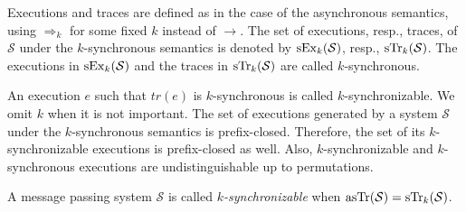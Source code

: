 Executions and traces are defined as in the case of the asynchronous semantics, using $\Rightarrow_k$ for some fixed $k$ instead of $\rightarrow$. The set of executions, resp., traces, of $\mathcal{S}$ under the $k$-synchronous semantics is denoted by $\synchExec{\mathcal{S}}{k}$, resp., $\synchTr{\mathcal{S}}{k}$. The executions in $\synchExec{\mathcal{S}}{k}$ and the traces in 
$\synchTr{\mathcal{S}}{k}$ are called $k$-synchronous. 

An execution $e$ such that $tr(e)$ is $k$-synchronous is called $k$-synchronizable. We omit $k$ when it is not important. 
The set of executions generated by a system $\mathcal{S}$ under the $k$-synchronous semantics is prefix-closed. Therefore, the set of its $k$-synchronizable executions is prefix-closed as well.
%
Also, $k$-synchronizable and $k$-synchronous executions are undistinguishable up to permutations.


\vspace{-1mm}
\begin{definition}\label{def:synchron}
A message passing system $\mathcal{S}$ is called \emph{$k$-synchronizable} when $\asynchTr{\mathcal{S}}=\synchTr{\mathcal{S}}{k}$.
\vspace{-1mm}
\end{definition}


